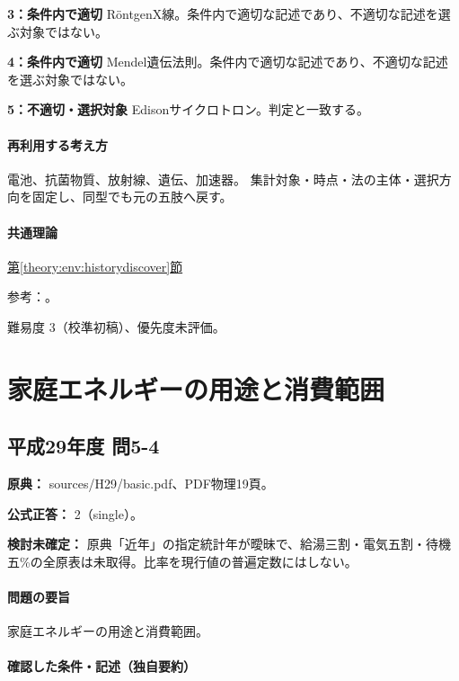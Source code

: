 \noindent\textbf{3：条件内で適切} RöntgenX線。条件内で適切な記述であり、不適切な記述を選ぶ対象ではない。\par

\noindent\textbf{4：条件内で適切} Mendel遺伝法則。条件内で適切な記述であり、不適切な記述を選ぶ対象ではない。\par

\noindent\textbf{5：不適切・選択対象} Edisonサイクロトロン。判定と一致する。\par

\paragraph{再利用する考え方} 電池、抗菌物質、放射線、遺伝、加速器。 集計対象・時点・法の主体・選択方向を固定し、同型でも元の五肢へ戻す。

\paragraph{共通理論} \hyperref[theory:env:historydiscover]{第\ref*{theory:env:historydiscover}節}

\par 参考：\cite{env59_lawrence}。

\par 難易度 3（校準初稿）、優先度未評価。

\section{家庭エネルギーの用途と消費範囲}

\subsection{平成29年度 問5-4}
\label{q:h29-reg-basic-5-4}

\noindent\textbf{原典：} sources/H29/basic.pdf、PDF物理19頁。

\textbf{公式正答：} 2（single）。

\par\textbf{検討未確定：} 原典「近年」の指定統計年が曖昧で、給湯三割・電気五割・待機五\%の全原表は未取得。比率を現行値の普遍定数にはしない。

\paragraph{問題の要旨} 家庭エネルギーの用途と消費範囲。

\paragraph{確認した条件・記述（独自要約）}\mbox{}\par

